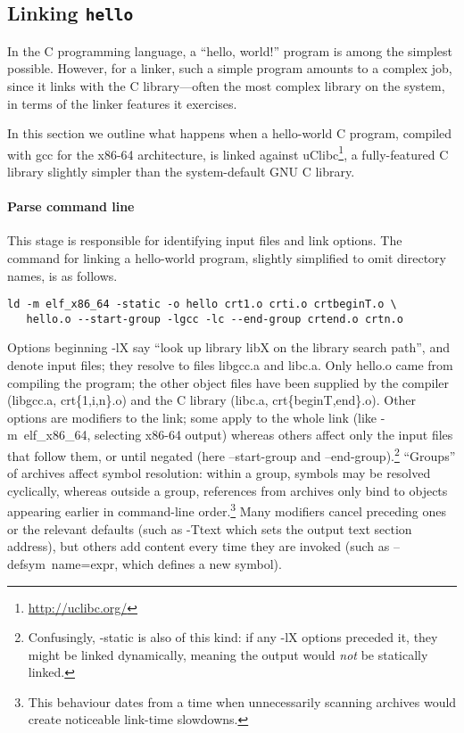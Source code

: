 \subsection{Linking \texttt{hello}}
\label{sec:hello}

In the C programming language, a ``hello, world!'' program is among the simplest possible.
However, for a linker, such a simple program amounts to a complex job,
since it links with the C library---often the most complex library on the system,
in terms of the linker features it exercises.

In this section we outline what happens when a hello-world C program, compiled with \textsf{gcc} 
for the x86-64 architecture,
is linked against uClibc\footnote{\url{http://uclibc.org/}}, 
a fully-featured C library slightly simpler than the system-default GNU C library.

\paragraph{Parse command line}
This stage is responsible for identifying input files and link options.
The command for linking a hello-world program, slightly simplified to omit directory names, 
is as follows.

\begin{lstlisting}[language=plain,basicstyle=\footnotesize\ttfamily]
ld -m elf_x86_64 -static -o hello crt1.o crti.o crtbeginT.o \
   hello.o --start-group -lgcc -lc --end-group crtend.o crtn.o 
\end{lstlisting}

Options beginning \textsf{-lX} say ``look up library \textsf{libX} on the library search path'', 
and denote input files; they resolve to files \textsf{libgcc.a} and \textsf{libc.a}.
Only \textsf{hello.o} came from compiling the program;
the other object files have been supplied by the compiler (\textsf{libgcc.a}, \textsf{crt\{1,i,n\}.o})
and the C library (\textsf{libc.a}, \textsf{crt\{beginT,end\}.o}).
Other options are modifiers to the link; some apply to the whole link 
(like \textsf{-m~elf\_x86\_64}, selecting x86-64 output)
whereas others affect only the input files that follow them, or until negated 
(here \textsf{--start-group} and \textsf{--end-group}).\footnote{Confusingly, \textsf{-static} is 
also of this kind: if any \textsf{-lX} options preceded it, they might be linked dynamically, meaning the output
would \emph{not} be statically linked.}
``Groups'' of archives affect symbol resolution: within a group,
symbols may be resolved cyclically, whereas outside a group, 
references from archives only bind to objects appearing earlier in command-line order.\footnote{This
behaviour dates from a time when unnecessarily scanning archives would create
noticeable link-time slowdowns.}
Many modifiers cancel preceding ones or the relevant defaults 
(such as \textsf{-Ttext} which sets the output text section address), 
but others add content every time they are invoked
(such as \textsf{--defsym~name=expr}, which defines a new symbol).

